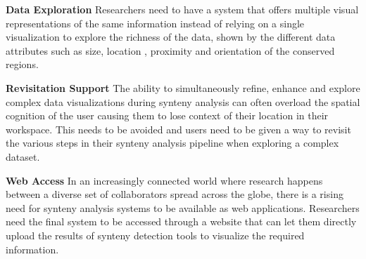\textbf{Data Exploration} Researchers need to have a system that offers multiple visual representations of the same information instead of relying on a single visualization to explore the richness of the data, shown by the different data attributes such as size, location , proximity and orientation of the conserved regions.

\textbf{Revisitation Support} The ability to simultaneously refine, enhance and explore complex data visualizations during synteny analysis can often overload the spatial cognition of the user causing them to lose context of their location in their workspace. This needs to be avoided and users need to be given a way to revisit the various steps in their synteny analysis pipeline when exploring a complex dataset.

\textbf{Web Access} In an increasingly connected world where research happens between a diverse set of collaborators spread across the globe, there is a rising need for synteny analysis systems to be available as web applications. Researchers need the final system to be accessed through a website that can let them directly upload the results of synteny detection tools to visualize the required information.




